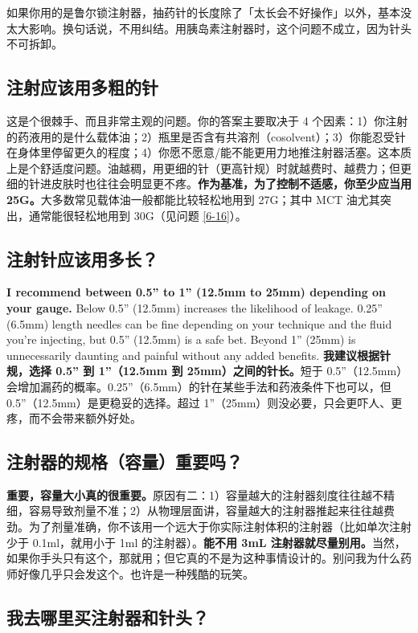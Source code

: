 \documentclass{article}
\begin{document}
如果你用的是鲁尔锁注射器，抽药针的长度除了「太长会不好操作」以外，基本没太大影响。换句话说，不用纠结。用胰岛素注射器时，这个问题不成立，因为针头不可拆卸。

\subsection{注射应该用多粗的针}\label{5-16}

这是个很棘手、而且非常主观的问题。你的答案主要取决于 4 个因素：1）你注射的药液用的是什么载体油；2）瓶里是否含有共溶剂（cosolvent）；3）你能忍受针在身体里停留更久的程度；4）你愿不愿意/能不能更用力地推注射器活塞。这本质上是个舒适度问题。油越稠，用更细的针（更高针规）时就越费时、越费力；但更细的针进皮肤时也往往会明显更不疼。\textbf{作为基准，为了控制不适感，你至少应当用 25G。}大多数常见载体油一般都能比较轻松地用到 27G；其中 MCT 油尤其突出，通常能很轻松地用到 30G（见问题 \ref{6-16}）。

\subsection{注射针应该用多长？}

\textbf{I recommend between 0.5” to 1” (12.5mm to 25mm) depending on your gauge.} Below 0.5” (12.5mm) increases the likelihood of leakage. 0.25” (6.5mm) length needles can be fine depending on your technique and the fluid you’re injecting, but 0.5” (12.5mm) is a safe bet. Beyond 1” (25mm) is unnecessarily daunting and painful without any added benefits.
\textbf{我建议根据针规，选择 0.5” 到 1”（12.5mm 到 25mm）之间的针长。}短于 0.5”（12.5mm）会增加漏药的概率。0.25”（6.5mm）的针在某些手法和药液条件下也可以，但 0.5”（12.5mm）是更稳妥的选择。超过 1”（25mm）则没必要，只会更吓人、更疼，而不会带来额外好处。

\subsection{注射器的规格（容量）重要吗？}

\textbf{重要，容量大小真的很重要。}原因有二：1）容量越大的注射器刻度往往越不精细，容易导致剂量不准；2）从物理层面讲，容量越大的注射器推起来往往越费劲。为了剂量准确，你不该用一个远大于你实际注射体积的注射器（比如单次注射少于 0.1ml，就用小于 1ml 的注射器）。\textbf{能不用 3mL 注射器就尽量别用。}当然，如果你手头只有这个，那就用；但它真的不是为这种事情设计的。别问我为什么药师好像几乎只会发这个。也许是一种残酷的玩笑。

\subsection{我去哪里买注射器和针头？}
\end{document}
